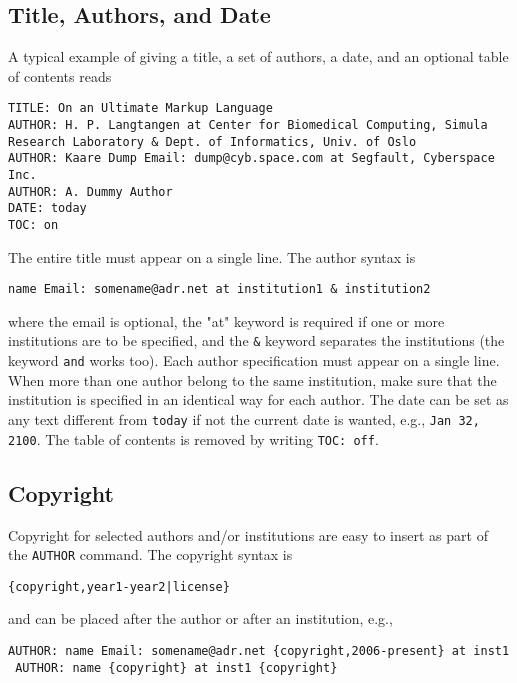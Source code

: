\documentclass[%
oneside,                 %
final,                   %
10pt]{article}
\begin{document}
\subsection{Title, Authors, and Date}
A typical example of giving a title, a set of authors, a date,
and an optional table of contents
reads
\begin{Verbatim}[numbers=none,fontsize=\fontsize{9pt}{9pt},baselinestretch=0.95,xleftmargin=2mm]
TITLE: On an Ultimate Markup Language
AUTHOR: H. P. Langtangen at Center for Biomedical Computing, Simula Research Laboratory & Dept. of Informatics, Univ. of Oslo
AUTHOR: Kaare Dump Email: dump@cyb.space.com at Segfault, Cyberspace Inc.
AUTHOR: A. Dummy Author
DATE: today
TOC: on

\end{Verbatim}

The entire title must appear on a single line.
The author syntax is
\begin{Verbatim}[numbers=none,fontsize=\fontsize{9pt}{9pt},baselinestretch=0.95,xleftmargin=2mm]
name Email: somename@adr.net at institution1 & institution2

\end{Verbatim}

where the email is optional, the "at" keyword is required if one or
more institutions are to be specified, and the \Verb!&! keyword
separates the institutions (the keyword \texttt{and} works too).
Each author specification must appear
on a single line.
When more than one author belong to the
same institution, make sure that the institution is specified in an identical
way for each author.
The date can be set as any text different from \texttt{today} if not the
current date is wanted, e.g., \texttt{Jan 32, 2100}.
The table of contents is removed by writing \texttt{TOC: off}.
\subsection{Copyright}
Copyright for selected authors and/or institutions are easy to insert as part
of the \texttt{AUTHOR} command. The copyright syntax is
\begin{Verbatim}[numbers=none,fontsize=\fontsize{9pt}{9pt},baselinestretch=0.95,xleftmargin=2mm]
{copyright,year1-year2|license}

\end{Verbatim}

and can be placed after the author or after an institution, e.g.,
\begin{Verbatim}[numbers=none,fontsize=\fontsize{9pt}{9pt},baselinestretch=0.95,xleftmargin=2mm]
 AUTHOR: name Email: somename@adr.net {copyright,2006-present} at inst1
 AUTHOR: name {copyright} at inst1 {copyright}

\end{Verbatim}
\end{document}
